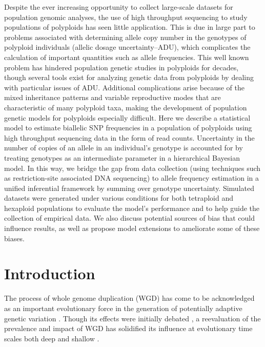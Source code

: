 \documentclass[11pt,english,letterpaper,oneside]{article}
\begin{document}
Despite the ever increasing opportunity to collect large-scale datasets for population genomic analyses, the use of high throughput sequencing to study populations of polyploids has seen little application. This is due in large part to problems associated with determining allele copy number in the genotypes of polyploid individuals (allelic dosage uncertainty--ADU), which complicates the calculation of important quantities such as allele frequencies. This well known problem has hindered population genetic studies in polyploids for decades, though several tools exist for analyzing genetic data from polyploids by dealing with particular issues of ADU. Additional complications arise because of the mixed inheritance patterns and variable reproductive modes that are characteristic of many polyploid taxa, making the development of population genetic models for polyploids especially difficult. Here we describe a statistical model to estimate biallelic SNP frequencies in a population of polyploids using high throughput sequencing data in the form of read counts. Uncertainty in the number of copies of an allele in an individual's genotype is accounted for by treating genotypes as an intermediate parameter in a hierarchical Bayesian model. In this way, we bridge the gap from data collection (using techniques such as restriction-site associated DNA sequencing) to allele frequency estimation in a unified inferential framework by summing over genotype uncertainty. Simulated datasets were generated under various conditions for both tetraploid and hexaploid populations to evaluate the model's performance and to help guide the collection of empirical data. We also discuss potential sources of bias that could influence results, as well as propose model extensions to ameliorate some of these biases.
\medskip

\section*{Introduction}            %

The process of whole genome duplication (WGD) has come to be acknowledged as an important evolutionary force in the generation of potentially adaptive genetic variation \citep{otto2000polyploidy,soltis2000PNASployploidy,soltisD2003polyploid,soltisd2009diversification,soltisd2010polyploidUnknowns,soltisd2014stebbins,Selmecki2015yeastAdaptation}. Though its effects were initially debated \citep{wagner1970noise,StebbinsVariationEvolution}, a reevaluation of the prevalence and impact of WGD has solidified its influence at evolutionary time scales both deep and shallow \citep{soltisd2004tragopogon,comai2005polyploid,cui2006genomeDuplication,jiao2011ancientWGD,canon2014polyploidyLegumes,douglas2015diploidizationCapsella}. 
\medskip
\end{document}
